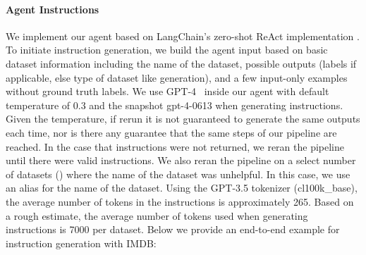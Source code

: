 \paragraph{Agent Instructions}
We implement our agent based on LangChain's zero-shot ReAct implementation \citep{langchain, yao2023react}.
To initiate instruction generation, we build the agent input based on basic dataset information including the name of the dataset, possible outputs (labels if applicable, else type of dataset like generation), and a few input-only examples without ground truth labels.
We use GPT-4~\citep{openai2023gpt4} inside our agent with default temperature of 0.3 and the snapshot gpt-4-0613 when generating instructions. Given the temperature, if rerun it is not guaranteed to generate the same outputs each time, nor is there any guarantee that the same steps of our pipeline are reached. In the case that instructions were not returned, we reran the pipeline until there were valid instructions. We also reran the pipeline on a select number of datasets (\InstrReranDatasets) where the name of the dataset was unhelpful. In this case, we use an alias for the name of the dataset. Using the GPT-3.5 tokenizer (cl100k\_base), the average number of tokens in the instructions is approximately 265. Based on a rough estimate, the average number of tokens used when generating instructions is 7000 per dataset.
Below we provide an end-to-end example for instruction generation with IMDB:

